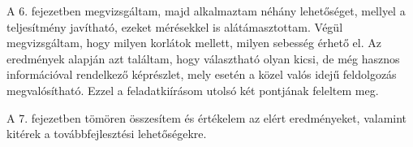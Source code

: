 {A 6. fejezetben megvizsgáltam, majd alkalmaztam néhány lehetőséget, mellyel a teljesítmény javítható, ezeket mérésekkel is alátámasztottam. Végül megvizsgáltam, hogy milyen korlátok mellett, milyen sebesség érhető el. Az eredmények alapján azt találtam, hogy választható olyan kicsi, de még hasznos információval rendelkező képrészlet, mely esetén a közel valós idejű feldolgozás megvalósítható. Ezzel a feladatkiírásom utolsó két pontjának feleltem meg.

A 7. fejezetben tömören összesítem és értékelem az elért eredményeket, valamint kitérek a továbbfejlesztési lehetőségekre.

}